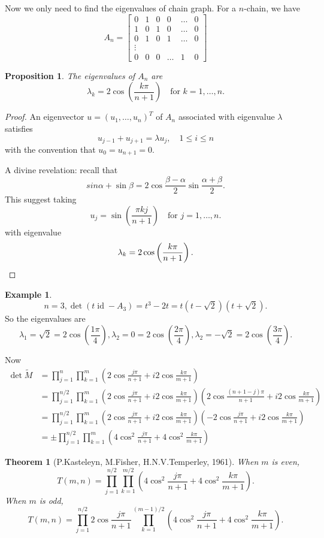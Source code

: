 \documentclass{report}
\def \id {\operatorname{id}}
\newtheorem{theorem}{Theorem}[section]
\newtheorem{proposition}{Proposition}[section]
\theoremstyle{definition}
\newtheorem{example}{Example}[section]
\theoremstyle{remark}
\numberwithin{equation}{section}
\begin{document}
Now we only need to find the eigenvalues of chain graph. For a $n$-chain, we have
\[
A_n = \begin{bmatrix}
0 & 1 & 0 & 0 & \ldots & 0 \\
1 & 0 & 1 & 0 & \ldots & 0 \\
0 & 1 & 0 & 1 & \ldots & 0 \\
\vdots \\
0 & 0 & 0 & \ldots & 1 & 0
\end{bmatrix}
\]
\begin{proposition}
The eigenvalues of $A_n$ are 
\[
\lambda_k = 2 \cos\left(\frac{k\pi}{n+1}\right)\quad \text{for } k = 1, \ldots, n.
\]
\end{proposition}
\begin{proof}
An eigenvector $u = (u_1, \ldots, u_n)^T$ of $A_n$ associated with eigenvalue $\lambda$ satisfies
\[
u_{j-1}+u_{j+1} = \lambda u_j, \quad 1 \leq i \leq n
\]
with the convention that $u_0 = u_{n+1} = 0$.


A divine revelation:
recall that \[sin\alpha + \sin\beta = 2\cos\frac{\beta - \alpha}{2}\sin\frac{\alpha+\beta}{2}.\]
This suggest taking
\[
u_j = \sin\left(\frac{\pi k j}{n + 1}\right) \quad \text{for } j = 1, \ldots, n.
\]
with eigenvalue 
\[
\lambda_k = 2 \cos\left(\frac{k\pi}{n+1}\right). \qedhere
\]
\end{proof}
\begin{example}
\[n = 3, \det(t\id - A_3) = t^3 - 2t = t(t - \sqrt{2})(t + \sqrt{2}).\]
So the eigenvalues are 
\[
\lambda_1 = \sqrt{2} = 2\cos\left(\frac{1\pi}{4}\right), \lambda_2 = 0 = 2\cos\left(\frac{2\pi}{4}\right), \lambda_2 = -\sqrt{2} = 2\cos\left(\frac{3\pi}{4}\right).
\]
\end{example}
Now
\begin{align*}
\det\tilde{M} & = \prod_{j=1}^n\prod_{k=1}^m \left(2\cos\frac{j\pi}{n+1} + i2\cos\frac{k\pi}{m+1}\right) \\ & = \prod_{j=1}^{n/2}\prod_{k=1}^m \left(2\cos\frac{j\pi}{n+1} + i2\cos\frac{k\pi}{m+1}\right)\left(2\cos\frac{(n+1-j)\pi}{n+1} + i2\cos\frac{k\pi}{m+1}\right) \\
& = \prod_{j=1}^{n/2}\prod_{k=1}^m \left(2\cos\frac{j\pi}{n+1} + i2\cos\frac{k\pi}{m+1}\right)\left(-2\cos\frac{j\pi}{n+1} + i2\cos\frac{k\pi}{m+1}\right) \\
& = \pm\prod_{j=1}^{n/2}\prod_{k=1}^m \left(4\cos^2\frac{j\pi}{n+1} + 4\cos^2\frac{k\pi}{m+1}\right)
\end{align*}

\begin{theorem}[P.Kasteleyn, M.Fisher, H.N.V.Temperley, 1961]
When $m$ is even,
\[
T(m, n) = \prod_{j=1}^{n/2}\prod_{k=1}^{m/2} \left(4\cos^2\frac{j\pi}{n+1} + 4\cos^2\frac{k\pi}{m+1}\right).
\]
When $m$ is odd,
\[
T(m, n) = \prod_{j=1}^{n/2}2\cos\frac{j\pi}{n+1}\prod_{k=1}^{(m-1)/2} \left(4\cos^2\frac{j\pi}{n+1} + 4\cos^2\frac{k\pi}{m+1}\right).
\]
\end{theorem}
\end{document}
